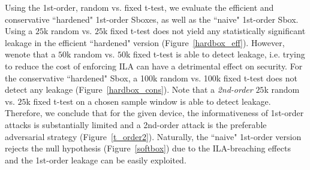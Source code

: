 
Using the 1st-order, random vs. fixed t-test, we evaluate the efficient and conservative ``hardened" 1st-order Sboxes, as well as the ``naive" 1st-order Sbox. Using a $25$k random vs. $25$k fixed t-test does not yield any statistically significant leakage in the efficient ``hardened" version (Figure~\ref{hardbox_eff}). However, wenote that a $50$k random vs. $50$k fixed t-test is able to detect leakage, i.e. trying to reduce the cost of enforcing ILA can have a detrimental effect on security. For the conservative ``hardened" Sbox, a 100k random vs. 100k fixed t-test does not detect any leakage (Figure~\ref{hardbox_cons}). Note that a \emph{2nd-order} $25$k random vs. $25$k fixed t-test on a chosen sample window is able to detect leakage. Therefore, we conclude that for the given device, the informativeness of 1st-order attacks is substantially limited and a 2nd-order attack is the preferable adversarial strategy (Figure~\ref{t_order2}). Naturally, the ``naive" 1st-order version rejects the null hypothesis (Figure~\ref{softbox}) due to the ILA-breaching effects and the 1st-order leakage can be easily exploited.
